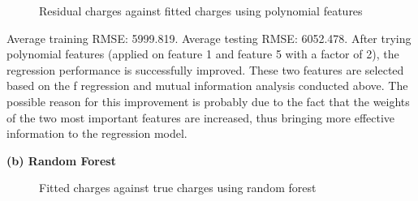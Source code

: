 \documentclass{article}
\begin{document}
\begin{figure}[!htbp]
\centering
{}
\caption{Residual charges against fitted charges using polynomial features} \label{3_4_a_2}
\end{figure}

Average training RMSE: 5999.819.\newline
\indent Average testing RMSE: 6052.478.\newline
\indent After trying polynomial features (applied on feature 1 and feature 5 with a factor of 2), the regression performance is successfully improved. These two features are selected based on the f regression and mutual information analysis conducted above. The possible reason for this improvement is probably due to the fact that the weights of the two most important features are increased, thus bringing more effective information to the regression model.\bigbreak

\noindent \textbf{(b) Random Forest} \bigbreak

\begin{figure}[!htbp]
\centering
{}
\caption{Fitted charges against true charges using random forest} \label{3_4_b_RF_1}
\end{figure}
\end{document}
